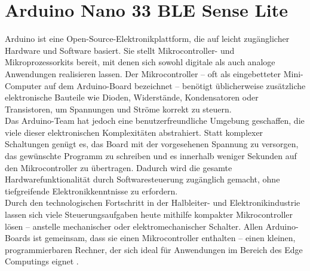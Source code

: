 %
%
%








\chapter{Arduino Nano 33 BLE Sense Lite}


Arduino ist eine Open-Source-Elektronikplattform, die auf leicht zugänglicher Hardware und Software basiert. Sie stellt Mikrocontroller- und Mikroprozessorkits bereit, mit denen sich sowohl digitale als auch analoge Anwendungen realisieren lassen. Der Mikrocontroller – oft als eingebetteter Mini-Computer auf dem Arduino-Board bezeichnet – benötigt üblicherweise zusätzliche elektronische Bauteile wie Dioden, Widerstände, Kondensatoren oder Transistoren, um Spannungen und Ströme korrekt zu steuern.\\

Das Arduino-Team hat jedoch eine benutzerfreundliche Umgebung geschaffen, die viele dieser elektronischen Komplexitäten abstrahiert. Statt komplexer Schaltungen genügt es, das Board mit der vorgesehenen Spannung zu versorgen, das gewünschte Programm zu schreiben und es innerhalb weniger Sekunden auf den Mikrocontroller zu übertragen. Dadurch wird die gesamte Hardwarefunktionalität durch Softwaresteuerung zugänglich gemacht, ohne tiefgreifende Elektronikkenntnisse zu erfordern.\\

Durch den technologischen Fortschritt in der Halbleiter- und Elektronikindustrie lassen sich viele Steuerungsaufgaben heute mithilfe kompakter Mikrocontroller lösen – anstelle mechanischer oder elektromechanischer Schalter. Allen Arduino-Boards ist gemeinsam, dass sie einen Mikrocontroller enthalten – einen kleinen, programmierbaren Rechner, der sich ideal für Anwendungen im Bereich des Edge Computings eignet
\cite{Arduino:2021b}.


